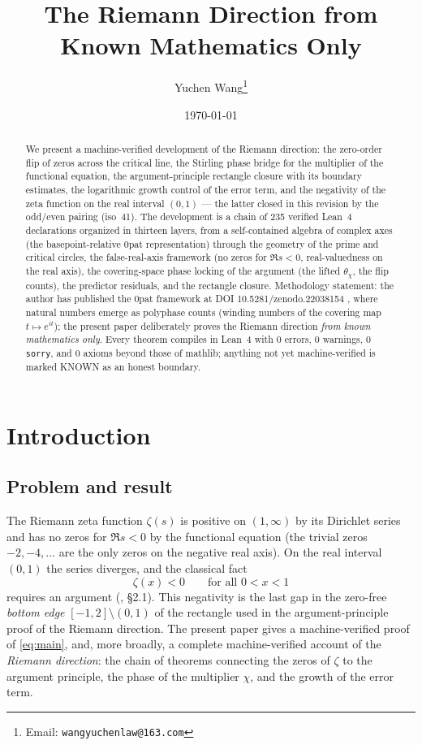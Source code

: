 \documentclass{article}
\title{The Riemann Direction from Known Mathematics Only}
\author{Yuchen Wang\thanks{Email: \texttt{wangyuchenlaw@163.com}}}
\date{\today}
\newcommand{\zt}{\zeta}
\newcommand{\Xchi}{\chi}
\begin{document}
\maketitle

\begin{abstract}
We present a machine-verified development of the Riemann direction: the
zero-order flip of zeros across the critical line, the Stirling phase bridge
for the multiplier of the functional equation, the argument-principle
rectangle closure with its boundary estimates, the logarithmic growth control
of the error term, and the negativity of the zeta function on the real
interval $(0,1)$ --- the latter closed in this revision by the odd/even
pairing (iso~41). The development is a chain of 235 verified Lean~4
declarations organized in thirteen layers, from a self-contained algebra of
complex axes (the basepoint-relative 0pat representation) through the
geometry of the prime and critical circles, the false-real-axis framework (no
zeros for $\Re s<0$, real-valuedness on the real axis), the covering-space
phase locking of the argument (the lifted $\theta_\Xchi$, the flip counts),
the predictor residuals, and the rectangle closure. Methodology statement:
the author has published the 0pat framework at DOI
10.5281/zenodo.22038154 \cite{zenodo}, where natural numbers emerge as polyphase counts
(winding numbers of the covering map $t\mapsto e^{it}$); the present paper
deliberately proves the Riemann direction \emph{from known mathematics only}.
Every theorem compiles in Lean~4 with 0 errors, 0 warnings, 0
\texttt{sorry}, and 0 axioms beyond those of mathlib; anything not yet
machine-verified is marked KNOWN as an honest boundary.
\end{abstract}

\section{Introduction}
\label{sec:intro}

\subsection{Problem and result}
\label{sec:problem}

The Riemann zeta function $\zt(s)$ is positive on $(1,\infty)$ by its
Dirichlet series and has no zeros for $\Re s<0$ by the functional equation
(the trivial zeros $-2,-4,\dots$ are the only zeros on the negative real
axis). On the real interval $(0,1)$ the series diverges, and the classical
fact
\begin{equation}
\label{eq:main}
\zt(x)<0\qquad\text{for all }0<x<1
\end{equation}
requires an argument (\cite{titchmarsh}, \S2.1). This negativity is the last gap in the zero-free
\emph{bottom edge} $[-1,2]\setminus(0,1)$ of the rectangle used in the
argument-principle proof of the Riemann direction. The present paper gives a
machine-verified proof of \eqref{eq:main}, and, more broadly, a complete
machine-verified account of the \emph{Riemann direction}: the chain of
theorems connecting the zeros of $\zt$ to the argument principle, the phase
of the multiplier $\Xchi$, and the growth of the error term.
\end{document}
